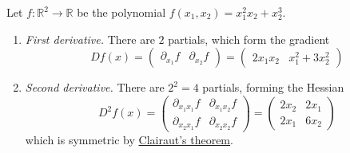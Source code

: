 	\begin{example}
    Let $f: \mathbb{R}^2 \to \mathbb{R}$ be the polynomial $f(x_1, x_2) = x_1^2 x_2 + x_2^3$. 
    \begin{enumerate}
      \item \textit{First derivative.} There are $2$ partials, which form the gradient 
      \begin{equation}
        Df(x) = \begin{pmatrix} \partial_{x_1} f & \partial_{x_2} f \end{pmatrix} = \begin{pmatrix} 2 x_1 x_2 & x_1^2 + 3 x_2^2 \end{pmatrix}
      \end{equation}

      \item \textit{Second derivative.} There are $2^2 = 4$ partials, forming the Hessian 
      \begin{equation}
        D^2 f(x) = \begin{pmatrix} \partial_{x_1 x_1} f & \partial_{x_1 x_2} f \\ \partial_{x_2 x_1} f & \partial_{x_2 x_2} f \end{pmatrix} = \begin{pmatrix} 2 x_2 & 2 x_1 \\ 2 x_1 & 6 x_2 \end{pmatrix}
      \end{equation}
      which is symmetric by \hyperref[thm:clairuts-theorem]{Clairaut's theorem}. 


\end{enumerate}
\end{example}
